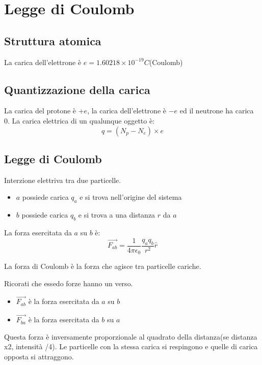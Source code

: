 \section{Legge di Coulomb}
\subsection{Struttura atomica}
La carica dell'elettrone è $e=1.60218 \times 10^{-19}C$(Coulomb)

\subsection{Quantizzazione della carica}
La carica del protone è $+e$, la carica dell'elettrone è $-e$ ed il neutrone ha carica 0.
La carica elettrica di un qualunque oggetto è:
\begin{equation}
    q = (N_p-N_e)\times e
\end{equation}

\subsection{Legge di Coulomb}
Interzione elettriva tra due particelle.
\begin{itemize}
    \item $a$ possiede carica $q_a$ e si trova nell'origine del sistema
    \item $b$ possiede carica $q_b$ e si trova a una distanza $r$ da $a$
\end{itemize}
La forza esercitata da $a$ su $b$ è:
\begin{equation}
    \vec{F_{ab}} = \frac{1}{4\pi \epsilon_0}\frac{q_aq_b}{r^2}\hat{r}
\end{equation}

La forza di Coulomb è la forza che agisce tra particelle cariche.


Ricorati che essedo forze hanno un verso.

\begin{itemize}
    \item $\vec{F_{ab}}$ è la forza esercitata da $a$ su $b$
    \item $\vec{F_{ba}}$ è la forza esercitata da $b$ su $a$
\end{itemize}

Questa forza è inversamente proporzionale al quadrato della distanza(se distanza x2, intensità /4).
Le particelle con la stessa carica si respingono e quelle di carica opposta si attraggono.

